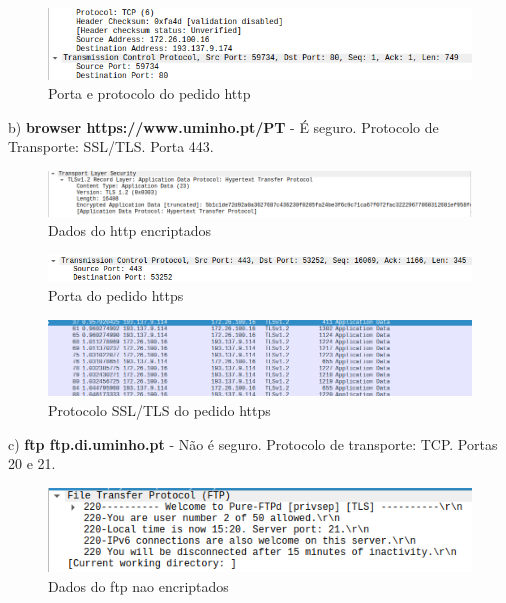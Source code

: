 \documentclass{article}
\begin{document}
\begin{figure}[h!]
    \centering
    \includegraphics[width=1\textwidth]{images/httpprotocol.png}
    \caption{Porta e protocolo do pedido http}
    \label{fig:enter-label}
\end{figure}



b) \textbf{browser https://www.uminho.pt/PT} - É seguro. Protocolo de Transporte: SSL/TLS. Porta 443.

\begin{figure}[h!]
    \centering
    \includegraphics[width=1\textwidth]{images/httpsdata.png}
    \caption{Dados do http encriptados}
    \label{fig:enter-label}
\end{figure}

\begin{figure}[h!]
    \centering
    \includegraphics[width=1\textwidth]{images/httpsport.png}
    \caption{Porta do pedido https}
    \label{fig:enter-label}
\end{figure}

\begin{figure}[h!]
    \centering
    \includegraphics[width=1\textwidth]{images/ssl.png}
    \caption{Protocolo SSL/TLS do pedido https}
    \label{fig:enter-label}
\end{figure}


c) \textbf{ftp ftp.di.uminho.pt} - Não é seguro. Protocolo de transporte: TCP. Portas 20 e 21.

\begin{figure}[h!]
    \centering
    \includegraphics[width=1\textwidth]{images/ftpdados.png}
    \caption{Dados do ftp nao encriptados}
    \label{fig:enter-label}
\end{figure}
\end{document}
